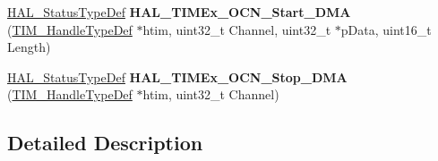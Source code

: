 \begin{DoxyCompactItemize}
\item 
\hyperlink{stm32f4xx__hal__def_8h_a63c0679d1cb8b8c684fbb0632743478f}{H\+A\+L\+\_\+\+Status\+Type\+Def} {\bfseries H\+A\+L\+\_\+\+T\+I\+M\+Ex\+\_\+\+O\+C\+N\+\_\+\+Start\+\_\+\+D\+MA} (\hyperlink{struct_t_i_m___handle_type_def}{T\+I\+M\+\_\+\+Handle\+Type\+Def} $\ast$htim, uint32\+\_\+t Channel, uint32\+\_\+t $\ast$p\+Data, uint16\+\_\+t Length)\hypertarget{group___t_i_m_ex___exported___functions___group2_gacf9eba45624d72a463fd0f950cf72964}{}\label{group___t_i_m_ex___exported___functions___group2_gacf9eba45624d72a463fd0f950cf72964}

\item 
\hyperlink{stm32f4xx__hal__def_8h_a63c0679d1cb8b8c684fbb0632743478f}{H\+A\+L\+\_\+\+Status\+Type\+Def} {\bfseries H\+A\+L\+\_\+\+T\+I\+M\+Ex\+\_\+\+O\+C\+N\+\_\+\+Stop\+\_\+\+D\+MA} (\hyperlink{struct_t_i_m___handle_type_def}{T\+I\+M\+\_\+\+Handle\+Type\+Def} $\ast$htim, uint32\+\_\+t Channel)\hypertarget{group___t_i_m_ex___exported___functions___group2_ga09216649456d28828492740232b275fd}{}\label{group___t_i_m_ex___exported___functions___group2_ga09216649456d28828492740232b275fd}

\end{DoxyCompactItemize}


\subsection{Detailed Description}
